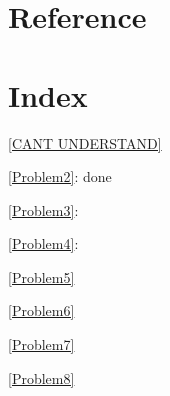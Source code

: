 \documentclass[11pt]{article}
\begin{document}
\section{Reference}
\label{sec:org491c48f}


\section{Index}
\label{sec:org35b9b8e}
\renewcommand{\indexname}{}
\printindex
\appendix
\ref{CANT UNDERSTAND}


\ref{Problem2}: done


\ref{Problem3}:


\ref{Problem4}:


\ref{Problem5}

\ref{Problem6}

\ref{Problem7}

\ref{Problem8}
\end{document}
